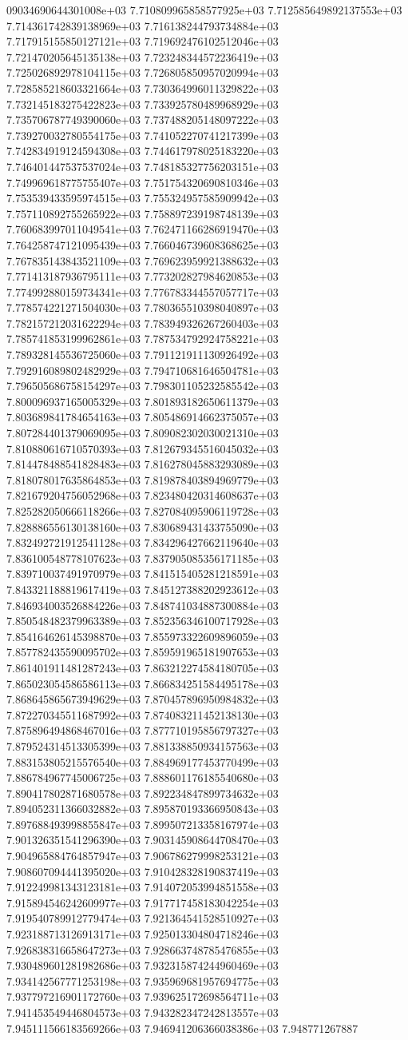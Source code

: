 09034690644301008e+03	7.710809965858577925e+03	7.712585649892137553e+03	7.714361742839138969e+03	7.716138244793734884e+03	7.717915155850127121e+03	7.719692476102512046e+03	7.721470205645135138e+03	7.723248344572236419e+03	7.725026892978104115e+03	7.726805850957020994e+03	7.728585218603321664e+03	7.730364996011329822e+03	7.732145183275422823e+03	7.733925780489968929e+03	7.735706787749390060e+03	7.737488205148097222e+03	7.739270032780554175e+03	7.741052270741217399e+03	7.742834919124594308e+03	7.744617978025183220e+03	7.746401447537537024e+03	7.748185327756203151e+03	7.749969618775755407e+03	7.751754320690810346e+03	7.753539433595974515e+03	7.755324957585909942e+03	7.757110892755265922e+03	7.758897239198748139e+03	7.760683997011049541e+03	7.762471166286919470e+03	7.764258747121095439e+03	7.766046739608368625e+03	7.767835143843521109e+03	7.769623959921388632e+03	7.771413187936795111e+03	7.773202827984620853e+03	7.774992880159734341e+03	7.776783344557057717e+03	7.778574221271504030e+03	7.780365510398040897e+03	7.782157212031622294e+03	7.783949326267260403e+03	7.785741853199962861e+03	7.787534792924758221e+03	7.789328145536725060e+03	7.791121911130926492e+03	7.792916089802482929e+03	7.794710681646504781e+03	7.796505686758154297e+03	7.798301105232585542e+03	7.800096937165005329e+03	7.801893182650611379e+03	7.803689841784654163e+03	7.805486914662375057e+03	7.807284401379069095e+03	7.809082302030021310e+03	7.810880616710570393e+03	7.812679345516045032e+03	7.814478488541828483e+03	7.816278045883293089e+03	7.818078017635864853e+03	7.819878403894969779e+03	7.821679204756052968e+03	7.823480420314608637e+03	7.825282050666118266e+03	7.827084095906119728e+03	7.828886556130138160e+03	7.830689431433755090e+03	7.832492721912541128e+03	7.834296427662119640e+03	7.836100548778107623e+03	7.837905085356171185e+03	7.839710037491970979e+03	7.841515405281218591e+03	7.843321188819617419e+03	7.845127388202923612e+03	7.846934003526884226e+03	7.848741034887300884e+03	7.850548482379963389e+03	7.852356346100717928e+03	7.854164626145398870e+03	7.855973322609896059e+03	7.857782435590095702e+03	7.859591965181907653e+03	7.861401911481287243e+03	7.863212274584180705e+03	7.865023054586586113e+03	7.866834251584495178e+03	7.868645865673949629e+03	7.870457896950984832e+03	7.872270345511687992e+03	7.874083211452138130e+03	7.875896494868467016e+03	7.877710195856797327e+03	7.879524314513305399e+03	7.881338850934157563e+03	7.883153805215576540e+03	7.884969177453770499e+03	7.886784967745006725e+03	7.888601176185540680e+03	7.890417802871680578e+03	7.892234847899734632e+03	7.894052311366032882e+03	7.895870193366950843e+03	7.897688493998855847e+03	7.899507213358167974e+03	7.901326351541296390e+03	7.903145908644708470e+03	7.904965884764857947e+03	7.906786279998253121e+03	7.908607094441395020e+03	7.910428328190837419e+03	7.912249981343123181e+03	7.914072053994851558e+03	7.915894546242609977e+03	7.917717458183042254e+03	7.919540789912779474e+03	7.921364541528510927e+03	7.923188713126913171e+03	7.925013304804718246e+03	7.926838316658647273e+03	7.928663748785476855e+03	7.930489601281982686e+03	7.932315874244960469e+03	7.934142567771253198e+03	7.935969681957694775e+03	7.937797216901172760e+03	7.939625172698564711e+03	7.941453549446804573e+03	7.943282347242813557e+03	7.945111566183569266e+03	7.946941206366038386e+03	7.948771267887